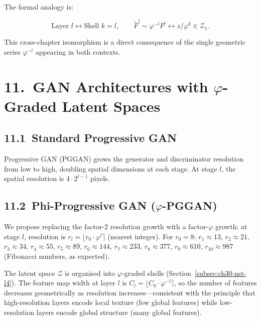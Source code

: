 The formal analogy is:

\[\text{Layer } l \leftrightarrow
  \text{Shell } k = l,
  \qquad
  \tilde{F}^l \sim \varphi^{-l} F^l
  \leftrightarrow
  z / \varphi^k \in \mathcal{Z}_1.\]

This cross-chapter isomorphism is a direct
consequence of the single geometric series
$\varphi^{-l}$ appearing in both contexts.

\section{11.\ GAN Architectures with
  $\varphi$-Graded Latent Spaces}%
  \label{sec:ch30-gan}

\subsection{11.1\ Standard Progressive
  GAN}\label{subsec:ch30-pggan}

Progressive GAN (PGGAN) grows the generator and
discriminator resolution from low to high,
doubling spatial dimensions at each stage.  At
stage $l$, the spatial resolution is
$4 \cdot 2^{l-1}$ pixels.

\subsection{11.2\ Phi-Progressive GAN
  (\texorpdfstring{$\varphi$}{phi}-PGGAN)}\label{subsec:ch30-phi-pggan}

We propose replacing the factor-2 resolution
growth with a factor-$\varphi$ growth:
at stage $l$, resolution is
$r_l = \lfloor r_0 \cdot \varphi^l \rceil$
(nearest integer).  For $r_0 = 8$:
$r_1 \approx 13$, $r_2 \approx 21$,
$r_3 \approx 34$, $r_4 \approx 55$,
$r_5 \approx 89$, $r_6 \approx 144$,
$r_7 \approx 233$, $r_8 \approx 377$,
$r_9 \approx 610$, $r_{10} \approx 987$
(Fibonacci numbers, as expected).

The latent space $\mathcal{Z}$ is organised into
$\varphi$-graded shells (Section~\ref{subsec:ch30-nst-l4}).
The feature map width at layer $l$ is
$C_l = \lfloor C_0 \cdot \varphi^{-l} \rceil$,
so the number of features decreases geometrically
as resolution increases---consistent with the
principle that high-resolution layers encode
local texture (few global features) while
low-resolution layers encode global structure
(many global features).

